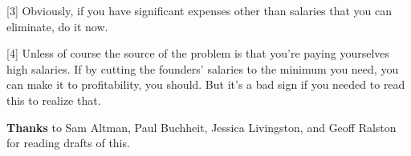 [3] Obviously, if you have significant expenses other than
                  salaries that you can eliminate, do it now.

[4] Unless of course the source of the problem is that you're
                  paying yourselves high salaries. If by cutting the founders'
                  salaries to the minimum you need, you can make it to
                  profitability, you should. But it's a bad sign if you needed
                  to read this to realize that.


                  \textbf{Thanks} to Sam Altman, Paul Buchheit, Jessica
                  Livingston, and Geoff Ralston for reading drafts of this.


              
            
          
